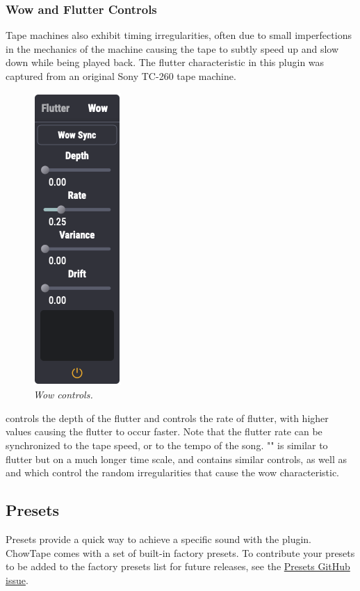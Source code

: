 \documentclass[landscape,twocolumn,a5paper]{manual}
\begin{document}
\subsubsection{Wow and Flutter Controls}
Tape machines also exhibit timing irregularities, often due
to small imperfections in the mechanics of the machine causing
the tape to subtly speed up and slow down while being
played back. The flutter characteristic in this plugin was
captured from an original Sony TC-260 tape machine.
%
\begin{figure}[ht]
    \center
    \includegraphics[height=0.35\paperheight]{../Plugin/Screenshots/Wow.png}
    \caption{\label{wow_controls}{\it Wow controls.}}
\end{figure}
%
\newline
{} controls the depth of the flutter and
 controls the rate of flutter, with higher values
causing the flutter to occur faster. Note that the
flutter rate can be synchronized to the tape speed, or to the
tempo of the song.
\newpar
"" is similar to flutter but on a much longer time scale,
and contains similar controls, as well as  and
 which control the random irregularities that
cause the wow characteristic.

\subsection{Presets}
Presets provide a quick way to achieve a specific sound
with the plugin. ChowTape comes with a set of built-in
factory presets. To contribute your presets to be added
to the factory presets list for future releases, see the
\href{https://github.com/jatinchowdhury18/AnalogTapeModel/issues/30}{Presets GitHub issue}.
\end{document}
